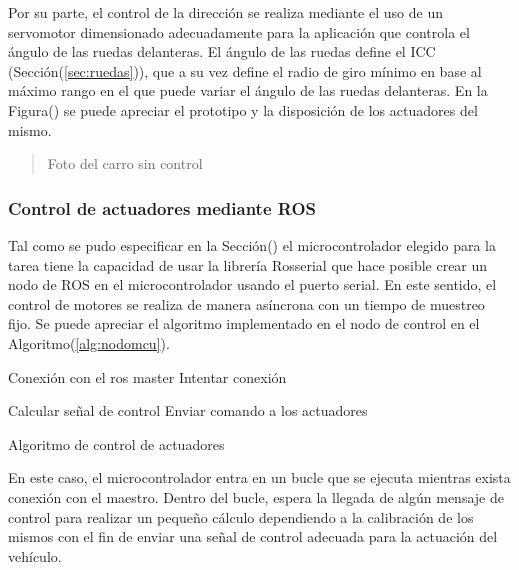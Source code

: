     Por su parte, el control de la dirección se realiza mediante el uso de un servomotor dimensionado adecuadamente para la aplicación 
    que controla el ángulo de las ruedas delanteras. El ángulo de las ruedas define el ICC (Sección(\ref{sec:ruedas})), que a su vez 
    define el radio de giro mínimo en base al máximo rango en el que puede variar el ángulo de las ruedas delanteras. En la 
    Figura() se puede apreciar el prototipo y la disposición de los actuadores del mismo.

    \begin{quote}
        Foto del carro sin control
    \end{quote}

        \subsubsection{Control de actuadores mediante ROS}
        Tal como se pudo especificar en la Sección() el microcontrolador elegido para la tarea tiene la capacidad de usar la 
        librería Rosserial que hace posible crear un nodo de ROS en el microcontrolador usando el puerto serial. En este sentido, 
        el control de motores se realiza de manera asíncrona con un tiempo de muestreo fijo. Se puede apreciar el algoritmo 
        implementado en el nodo de control en el Algoritmo(\ref{alg:nodomcu}).

        \begin{algorithm}
            \begin{algorithmic}[1]
            \STATE Conexión con el ros master
            \STATE Intentar conexión
            \ENDWHILE
            
                    \STATE Calcular señal de control
                    \STATE Enviar comando a los actuadores
                \ENDIF
            \ENDWHILE
            \end{algorithmic}
            \caption{Algoritmo de control de actuadores}\label{alg:nodomcu}
        \end{algorithm}
        
        En este caso, el microcontrolador entra en un bucle que se ejecuta mientras exista conexión con el maestro. Dentro del 
        bucle, espera la llegada de algún mensaje de control para realizar un pequeño cálculo dependiendo a la calibración de 
        los mismos con el fin de enviar una señal de control adecuada para la actuación del vehículo.

